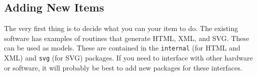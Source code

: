 \documentclass[10pt, openany, draft]{article}
\begin{document}
\subsection{Adding New Items}
The very first thing is to decide what you can your item to do.  The existing software has examples of routines that generate HTML, XML, and SVG.  These can be used as models.  These are contained in the \texttt{internal} (for HTML and XML) and \texttt{svg} (for SVG) packages.  If you need to interface with other hardware or software, it will probably be best to add new packages for these interfaces.
\end{document}

